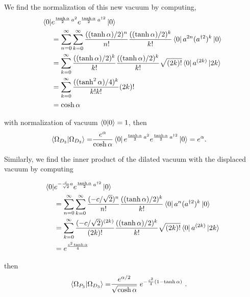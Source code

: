 \documentclass[%
 reprint,
superscriptaddress,
 amsmath,amssymb,
 aps,
]{revtex4-2}
\begin{document}
We find the normalization of this new vacuum by computing,
\begin{align}
    \bra{0}&e^{\frac{\tanh\alpha}{2}\,a^{2}} e^{\frac{\tanh\alpha}{2}\,a^{\dagger2}}\ket{0}\nonumber\\
    &=\sum_{n=0}^{\infty}\sum_{k=0}^{\infty}\frac{((\tanh\alpha)/2)^n}{n!}\frac{((\tanh\alpha)/2)^k}{k!}\bra{0}a^{2n} (a^{\dagger2})^k\ket{0}\nonumber\\
    &=\sum_{k=0}^{\infty}\frac{((\tanh\alpha)/2)^k}{k!}\frac{((\tanh\alpha)/2)^k}{k!}\sqrt{(2k)!}\bra{0}a^{(2k)} \ket{2k}\nonumber\\
    &=\sum_{k=0}^{\infty}\frac{((\tanh^2{\alpha})/4)^k}{k!k!}(2k)!\nonumber\\
    &=\cosh{\alpha}
\end{align}

with normalization of vacuum $\braket{0|0}=1$, then
\begin{align}
    \braket{\Omega_{D_{3}}|\Omega_{D_{3}}} =&  \frac{e^{\alpha}}{\cosh\alpha}  \bra{0}e^{\frac{\tanh\alpha}{2}\,a^{2}} e^{\frac{\tanh\alpha}{2}\,a^{\dagger2}}\ket{0}=e^{\alpha}.
\end{align}

Similarly, we find the inner product of the dilated vacuum with
the displaced vacuum by computing

\begin{align}
    \bra{0}&e^{-\frac{c}{\sqrt{2}}a} e^{\frac{\tanh\alpha}{2}\,a^{\dagger2}}\ket{0}\nonumber\\
    &=\sum_{n=0}^{\infty}\sum_{k=0}^{\infty}\frac{(-c/\sqrt{2})^n}{n!}\frac{((\tanh\alpha)/2)^k}{k!}\bra{0}a^n (a^{\dagger2})^k\ket{0}\nonumber\\
    &=\sum_{k=0}^{\infty}\frac{(-c/\sqrt{2})^{(2k)}}{(2k)!}\frac{((\tanh\alpha)/2)^k}{k!}\sqrt{(2k)!}\bra{0}a^{(2k)} \ket{2k}\nonumber\\
    &=e^{\frac{c^2\tanh\alpha}{4}}
\end{align}

then
\begin{align}
    \braket{\Omega_{P_{3}}|\Omega_{D_{3}}} =& \frac{e^{\alpha/2}}{\sqrt{\cosh\alpha}}\; e^{-\frac{c^2}{4}(1-\tanh\alpha)}~.
\end{align}



\end{document}
